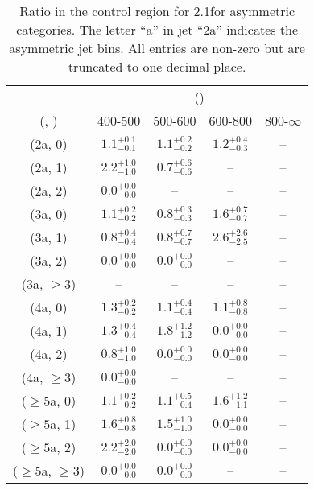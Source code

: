 \begin{table}[h!]
\tiny
\centering
\caption{Ratio in the \gj control region for 2.1\ifb for asymmetric categories. The letter ``a'' in jet \eg ``2a''  indicates the asymmetric jet bins. All entries are non-zero but are truncated to one decimal place.\label{tab:ratiosepnaive_gj_ewk_asym}}
\begin{tabular}
{ccccc}
	\hline\hline
	& \multicolumn{4}{c}{\scalht (\gev)} \\ 
	 (\njet,  \nb) & 400-500 & 500-600 & 600-800 & 800-$\infty$ \\ [0.8ex] 
\hline
	(2a, 0) & $1.1^{+ 0.1 }_{- 0.1 }$ & $1.1^{+ 0.2 }_{- 0.2 }$ & $1.2^{+ 0.4 }_{- 0.3 }$ & -- \\[0.5ex] 
	(2a, 1) & $2.2^{+ 1.0 }_{- 1.0 }$ & $0.7^{+ 0.6 }_{- 0.6 }$ & -- & -- \\[0.5ex] 
	(2a, 2) & $0.0^{+ 0.0 }_{- 0.0 }$ & -- & -- & -- \\[0.5ex] 
	(3a, 0) & $1.1^{+ 0.2 }_{- 0.2 }$ & $0.8^{+ 0.3 }_{- 0.3 }$ & $1.6^{+ 0.7 }_{- 0.7 }$ & -- \\[0.5ex] 
	(3a, 1) & $0.8^{+ 0.4 }_{- 0.4 }$ & $0.8^{+ 0.7 }_{- 0.7 }$ & $2.6^{+ 2.6 }_{- 2.5 }$ & -- \\[0.5ex] 
	(3a, 2) & $0.0^{+ 0.0 }_{- 0.0 }$ & $0.0^{+ 0.0 }_{- 0.0 }$ & -- & -- \\[0.5ex] 
	(3a, $\ge3$) & -- & -- & -- & -- \\[0.5ex] 
	(4a, 0) & $1.3^{+ 0.2 }_{- 0.2 }$ & $1.1^{+ 0.4 }_{- 0.4 }$ & $1.1^{+ 0.8 }_{- 0.8 }$ & -- \\[0.5ex] 
	(4a, 1) & $1.3^{+ 0.4 }_{- 0.4 }$ & $1.8^{+ 1.2 }_{- 1.2 }$ & $0.0^{+ 0.0 }_{- 0.0 }$ & -- \\[0.5ex] 
	(4a, 2) & $0.8^{+ 1.0 }_{- 1.0 }$ & $0.0^{+ 0.0 }_{- 0.0 }$ & $0.0^{+ 0.0 }_{- 0.0 }$ & -- \\[0.5ex] 
	(4a, $\ge3$) & $0.0^{+ 0.0 }_{- 0.0 }$ & -- & -- & -- \\[0.5ex] 
	($\ge5$a, 0) & $1.1^{+ 0.2 }_{- 0.2 }$ & $1.1^{+ 0.5 }_{- 0.4 }$ & $1.6^{+ 1.2 }_{- 1.1 }$ & -- \\[0.5ex] 
	($\ge5$a, 1) & $1.6^{+ 0.8 }_{- 0.8 }$ & $1.5^{+ 1.0 }_{- 1.0 }$ & $0.0^{+ 0.0 }_{- 0.0 }$ & -- \\[0.5ex] 
	($\ge5$a, 2) & $2.2^{+ 2.0 }_{- 2.0 }$ & $0.0^{+ 0.0 }_{- 0.0 }$ & $0.0^{+ 0.0 }_{- 0.0 }$ & -- \\[0.5ex] 
	($\ge5$a, $\ge3$) & $0.0^{+ 0.0 }_{- 0.0 }$ & $0.0^{+ 0.0 }_{- 0.0 }$ & -- & -- \\[0.5ex] 
	\hline
	\hline
\end{tabular}
\end{table}
